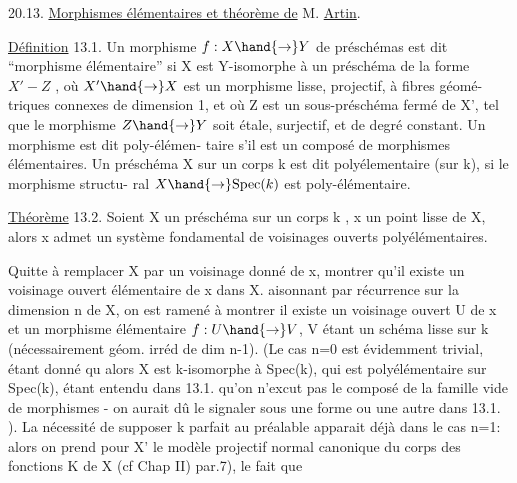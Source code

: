
20.13. \uline{Morphismes élémentaires et théorème de} M. \uline{Artin}.

\uline{Définition} 13.1. Un morphisme $f:X\hand{\to} Y$ de préschémas est dit ``morphisme
 élémentaire'' si X est  Y-isomorphe à un préschéma de la forme
$X' - Z$ , où $X'\hand{\to} X$ est un morphisme lisse, projectif, à fibres géomé-%
triques connexes\xout{\unsure{,}} de dimension 1, et où Z est un sous-préschéma fermé
de X',  tel que le morphisme $Z\hand{\to} Y$ soit étale, surjectif, et
de degré constant. Un morphisme est dit  poly-élémen-%
taire s'il est un composé de morphismes élémentaires. Un préschéma X
sur un corps k est dit polyélementaire (sur k), si le morphisme structu-%
ral $X\hand{\to} \mathrm{Spec}(k)$ est poly-élémentaire.

\uline{Théorème} 13.2.  Soient X un préschéma  sur un corps k , x un point lisse
de X, alors x admet un système fondamental de voisinages ouverts
polyélémentaires.

Quitte à remplacer X par un voisinage donné de x,  
  montrer qu'il existe un voisinage ouvert élémentaire de x dans X.
  aisonnant par récurrence sur
la dimension n de X, on  est ramené à montrer  il existe
un voisinage ouvert U de x et un morphisme élémentaire $f: U\hand{\to} V$,
V étant un schéma lisse sur k (nécessairement géom. irréd  de dim n-1).
 (Le cas n=0 est évidemment trivial, étant donné qu alors
X est k-isomorphe à Spec(k), qui est polyélémentaire sur Spec(k), étant
entendu dans 13.1. qu'on n'excut pas le composé de la famille vide de
morphismes - on aurait dû le signaler sous une forme ou une autre dans
13.1. ). La nécessité de supposer k parfait au préalable apparait déjà
dans le cas n=1: alors on prend pour X' le modèle projectif normal
canonique du corps des fonctions K de X (cf Chap II) par.7), le fait que

